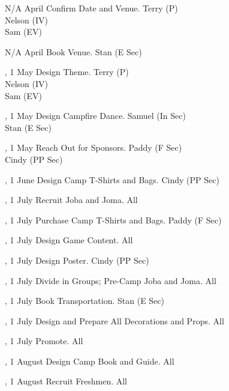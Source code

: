 \eTABLEhead
\bTABLEbody

\bTR\bTD N/A
\eTD{} April
\eTD\bTD Confirm Date and Venue.
\eTD\bTD Terry (P) \\ Nelson (IV) \\ Sam (EV)
\eTD\eTR

\bTR\bTD N/A
\eTD{} April
\eTD\bTD Book Venue.
\eTD\bTD Stan (E Sec)
\eTD\eTR

\bTR{}, 1
\eTD{} May
\eTD\bTD Design Theme.
\eTD\bTD Terry (P) \\ Nelson (IV) \\ Sam (EV)
\eTD\eTR

\bTR{}, 1
\eTD{} May
\eTD\bTD Design Campfire Dance.
\eTD\bTD Samuel (In Sec) \\ Stan (E Sec)
\eTD\eTR

\bTR{}, 1
\eTD{} May
\eTD\bTD Reach Out for Sponsors.
\eTD\bTD Paddy (F Sec) \\ Cindy (PP Sec)
\eTD\eTR

\bTR{}, 1
\eTD{} June
\eTD\bTD Design Camp T-Shirts and Bags.
\eTD\bTD Cindy (PP Sec)
\eTD\eTR

\bTR{}, 1
\eTD{} July
\eTD\bTD Recruit Joba and Joma.
\eTD\bTD All
\eTD\eTR

\bTR{}, 1
\eTD{} July
\eTD\bTD Purchase Camp T-Shirts and Bags.
\eTD\bTD Paddy (F Sec)
\eTD\eTR

\bTR{}, 1
\eTD{} July
\eTD\bTD Design Game Content.
\eTD\bTD All
\eTD\eTR

\bTR{}, 1
\eTD{} July
\eTD\bTD Design Poster.
\eTD\bTD Cindy (PP Sec)
\eTD\eTR

\bTR{}, 1
\eTD{} July
\eTD\bTD Divide in Groups; Pre-Camp Joba and Joma.
\eTD\bTD All
\eTD\eTR

\bTR{}, 1
\eTD{} July
\eTD\bTD Book Transportation.
\eTD\bTD Stan (E Sec)
\eTD\eTR

\bTR{}, 1
\eTD{} July
\eTD\bTD Design and Prepare All Decorations and Props.
\eTD\bTD All
\eTD\eTR

\bTR{}, 1
\eTD{} July
\eTD\bTD Promote.
\eTD\bTD All
\eTD\eTR

\bTR{}, 1
\eTD{} August
\eTD\bTD Design Camp Book and Guide.
\eTD\bTD All
\eTD\eTR

\bTR{}, 1
\eTD{} August
\eTD\bTD Recruit Freshmen.
\eTD\bTD All
\eTD\eTR

